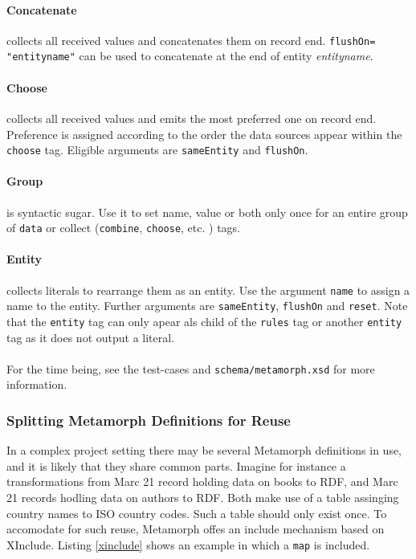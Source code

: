 \documentclass[12pt,a4paper]{article}
\begin{document}
\paragraph{Concatenate}
collects all received values and concatenates them on record end. {\tt flushOn= "entityname"} can be used to concatenate at the end of entity {\it entityname}.

\paragraph{Choose}
collects all received values and emits the most preferred one on record end. Preference is assigned according to the order the data sources appear within the {\tt choose} tag.  Eligible arguments are {\tt sameEntity} and {\tt flushOn}.

\paragraph{Group} is syntactic sugar. Use it to set name, value or both only once for an entire group of {\tt data} or collect ({\tt combine}, {\tt choose}, etc. ) tags.

\paragraph{Entity} collects literals to rearrange them as an entity. Use the argument {\tt name} to assign a name to the entity. Further arguments are {\tt sameEntity}, {\tt flushOn} and {\tt reset}. Note that the {\tt entity} tag can only apear als child of the {\tt rules} tag or another {\tt entity} tag as it does not output a literal.

\paragraph{}For the time being, see the test-cases and {\tt schema/metamorph.xsd} for more information.

\subsubsection{Splitting Metamorph Definitions for Reuse}

In a complex project setting there may be several Metamorph definitions in use, and it is likely that they share common parts. Imagine for instance a transformations from Marc 21 record holding data on books to RDF, and Marc 21 records hodling data on authors to RDF. Both make use of a table assinging country names to ISO country codes. Such a table should only exist once. To accomodate for such reuse, Metamorph offes an include mechanism based on XInclude. Listing \ref{xinclude} shows an example in which a {\tt map} is included.
\end{document}

